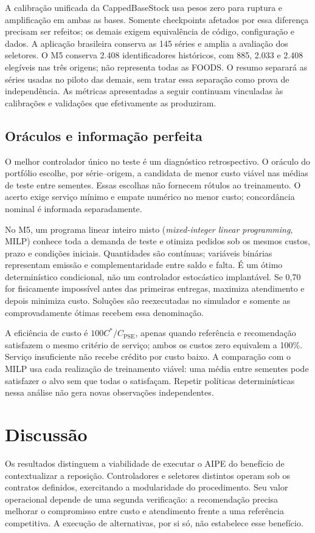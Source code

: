 \documentclass[preprint,12pt]{elsarticle}
\begin{document}
A calibração unificada da CappedBaseStock usa pesos zero para ruptura e amplificação em ambas as bases. Somente checkpoints afetados por essa diferença precisam ser refeitos; os demais exigem equivalência de código, configuração e dados. A aplicação brasileira conserva as 145 séries e amplia a avaliação dos seletores. O M5 conserva 2.408 identificadores históricos, com 885, 2.033 e 2.408 elegíveis nas três origens; não representa todas as FOODS. O resumo separará as séries usadas no piloto das demais, sem tratar essa separação como prova de independência. As métricas apresentadas a seguir continuam vinculadas às calibrações e validações que efetivamente as produziram.

\subsection{Oráculos e informação perfeita}
O melhor controlador único no teste é um diagnóstico retrospectivo. O oráculo do portfólio escolhe, por série--origem, a candidata de menor custo viável nas médias de teste entre sementes. Essas escolhas não fornecem rótulos ao treinamento. O acerto exige serviço mínimo e empate numérico no menor custo; concordância nominal é informada separadamente.

No M5, um programa linear inteiro misto (\textit{mixed-integer linear programming}, MILP) conhece toda a demanda de teste e otimiza pedidos sob os mesmos custos, prazo e condições iniciais. Quantidades são contínuas; variáveis binárias representam emissão e complementaridade entre saldo e falta. É um ótimo determinístico condicional, não um controlador estocástico implantável. Se 0,70 for fisicamente impossível antes das primeiras entregas, maximiza atendimento e depois minimiza custo. Soluções são reexecutadas no simulador e somente as comprovadamente ótimas recebem essa denominação.

A eficiência de custo é $100C^*/C_{\mathrm{PSE}}$, apenas quando referência e recomendação satisfazem o mesmo critério de serviço; ambos os custos zero equivalem a 100\%. Serviço insuficiente não recebe crédito por custo baixo. A comparação com o MILP usa cada realização de treinamento viável: uma média entre sementes pode satisfazer o alvo sem que todas o satisfaçam. Repetir políticas determinísticas nessa análise não gera novas observações independentes.





\section{Discussão}
Os resultados distinguem a viabilidade de executar o AIPE do benefício de contextualizar a reposição. Controladores e seletores distintos operam sob os contratos definidos, exercitando a modularidade do procedimento. Seu valor operacional depende de uma segunda verificação: a recomendação precisa melhorar o compromisso entre custo e atendimento frente a uma referência competitiva. A execução de alternativas, por si só, não estabelece esse benefício.
\end{document}
